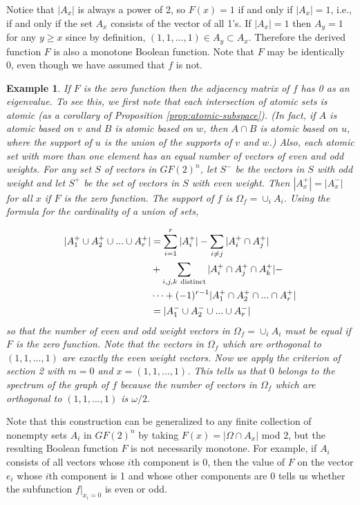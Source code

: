 \documentclass[12pt]{article}
\newtheorem{example}[theorem]{Example}
\begin{document}
Notice that $|A_x|$ is always a power of 2, so $F(x)=1$ if and only if $|A_x|=1$, i.e., if and only if the set $A_x$ consists of the vector
of all 1's.  If $|A_x|=1$ then $A_y=1$ for any $y \geq x$ since by
definition, $(1,1,...,1) \in A_y \subset A_x$.
Therefore the derived function $F$ is also a monotone Boolean function.  Note that $F$ may be identically 0, even though we have assumed that $f$ is not.

\begin{example}
If $F$ is the zero function then the adjacency matrix of $f$ has 0 as an eigenvalue.  To see this,
we first note that each intersection of atomic sets is atomic (as a
corollary of Proposition \ref{prop:atomic-subspace}).
(In fact, if $A$ is atomic based on $v$ and $B$ is atomic based on
$w$, then $A \cap B$ is atomic
based on $u$, where the support of $u$ is the union of the supports of
$v$ and $w$.)  Also, each atomic
set with more than one element has an equal number of vectors of even
and odd weights.
For any set $S$ of vectors in $GF(2)^n$, let
$S^-$ be the vectors in $S$ with odd weight and let $S^+$ be the set of vectors in $S$ with even weight.  Then $|A_x^+|=|A_x^-|$ for
all $x$ if $F$ is the zero function.  The support of $f$ is
$\Omega_f=\cup_i A_i$.  Using the formula for the cardinality of a
union of sets,

\begin{align*}
|A_1^+ \cup A_2^+ \cup ... \cup A_r^+|
&=\sum_{i=1}^r |A_i^+| - \sum_{i\neq j} |A_i^+ \cap A_j^+| \\
&+ \sum_{i,j,k\ {\rm distinct}} |A_i^+ \cap A_j^+ \cap A_k^+| -  \\
& \dots +(-1)^{r-1} |A_1^+ \cap A_2^+ \cap ... \cap A_r^+|\\
&=|A_1^- \cup A_2^- \cup ... \cup A_r^-|
\end{align*}
so that the number of even and odd weight vectors in $\Omega_f=\cup_i A_i$ must be equal if $F$ is the zero function.
Note that the vectors in $\Omega_f$ which are orthogonal to $(1,1,...,1)$ are exactly the even weight vectors.
Now we apply the criterion of section 2 with $m=0$ and $x=(1,1,...,1)$.   This tells us that $0$ belongs to the spectrum
of the graph of $f$ because the number of vectors in $\Omega_f$ which are orthogonal to $(1,1,...,1)$ is $\omega/2$.

\end{example}

Note that this construction can be generalized to any finite
collection of nonempty
sets $A_i$ in $GF(2)^n$ by taking $F(x)=|\Omega \cap A_x|$ mod $2$,
but the resulting
Boolean function $F$ is not necessarily monotone.  For example, if
$A_i$ consists
of all vectors whose $i$th component is $0$, then the value of $F$ on
the vector $e_i$
whose $i$th component is 1 and whose other components are 0 tells us whether the subfunction $f|_{x_i=0}$ is even or odd.
\end{document}

